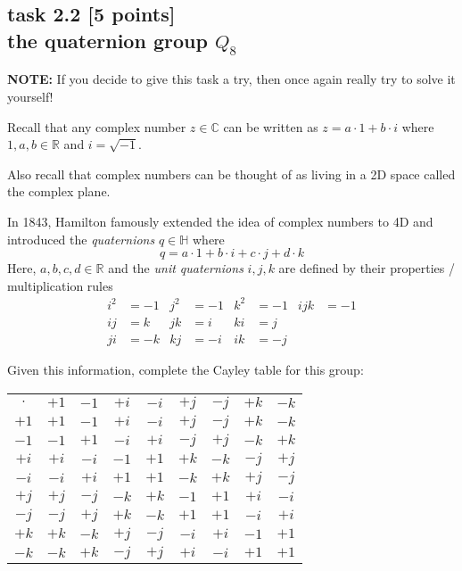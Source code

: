 
\subsection*{task 2.2 [5 points] \\[1ex] the quaternion group $Q_8$}

\textbf{NOTE:} If you decide to give this task a try, then once again really try to solve it yourself!

Recall that any complex number $z \in \mathbb{C}$ can be written as $z = a \cdot 1 + b \cdot i$ where $1, a, b \in \mathbb{R}$ and $i = \sqrt{-1}$. 

Also recall that complex numbers can be thought of as living in a 2D space called the complex plane.

In 1843, Hamilton famously extended the idea of complex numbers to 4D and introduced the \emph{quaternions} $q \in \mathbb{H}$ where
\begin{equation*}
q = a \cdot 1 + b \cdot i + c \cdot j + d \cdot k
\end{equation*}
Here, $a, b, c, d \in \mathbb{R}$ and the \emph{unit quaternions} $i, j, k$ are defined by their properties / multiplication rules
\begin{align*}
i^2 & = -1 & j^2 & = -1 & k^2 & = -1 & ijk & = -1 \\[1ex]
ij & = k & jk & = i & ki & = j \\
ji & = -k & kj & = -i & ik & = -j
\end{align*}

Given this information, complete the Cayley table for this group:
\begin{center}
  \begin{tabular}{>{\columncolor[gray]{0.8}}ccccccccc}
  \rowcolor[gray]{0.8} $\cdot$ & $+1$ & $-1$ & $+i$ & $-i$ & $+j$ & $-j$ & $+k$ & $-k$ \\
  $+1$  & $+1$ & $-1$ & $+i$ & $-i$ & $+j$ & $-j$ & $+k$ & $-k$ \\
  $-1$  & $-1$ & $+1$ & $-i$ & $+i$ & $-j$ & $+j$ & $-k$ & $+k$ \\
  $+i$  & $+i$ & $-i$ & $-1$ & $+1$ & $+k$ & $-k$ & $-j$ & $+j$ \\
  $-i$  & $-i$ & $+i$ & $+1$ & $+1$ & $-k$ & $+k$ & $+j$ & $-j$ \\
  $+j$  & $+j$ & $-j$ & $-k$ & $+k$ & $-1$ & $+1$ & $+i$ & $-i$ \\ 
  $-j$  & $-j$ & $+j$ & $+k$ & $-k$ & $+1$ & $+1$ & $-i$ & $+i$ \\
  $+k$  & $+k$ & $-k$ & $+j$ & $-j$ & $-i$ & $+i$ & $-1$ & $+1$ \\ 
  $-k$  & $-k$ & $+k$ & $-j$ & $+j$ & $+i$ & $-i$ & $+1$ & $+1$ 
  \end{tabular}
\end{center}
\vspace{1ex}

